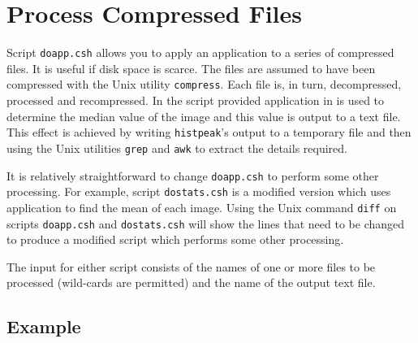 \documentclass[twoside,11pt]{starlink}
\begin{document}
\newpage
\section{\label{DOAPP}Process Compressed Files}

Script \texttt{doapp.csh} allows you to apply an application to a series
of compressed files.  It is useful if disk space is scarce.  The files
are assumed to have been compressed with the Unix utility \texttt{compress}.
Each file is, in turn, decompressed, processed and recompressed.  In the
script provided application  in
 is used to determine the median value of the image and
this value is output to a text file.  This effect is achieved by writing
\texttt{histpeak}'s output to a temporary file and then using the Unix
utilities \texttt{grep} and \texttt{awk} to extract the details required.

It is relatively straightforward to change \texttt{doapp.csh} to perform
some other processing.  For example, script \texttt{dostats.csh} is a
modified version which uses  application
 to find the mean of each image.
Using the Unix command \texttt{diff} on scripts \texttt{doapp.csh} and
\texttt{dostats.csh} will show the lines that need to be changed to
produce a modified script which performs some other processing.

The input for either script consists of the names of one or more files to
be processed (wild-cards are permitted) and the name of the output text
file.

\subsection*{Example}
\end{document}
